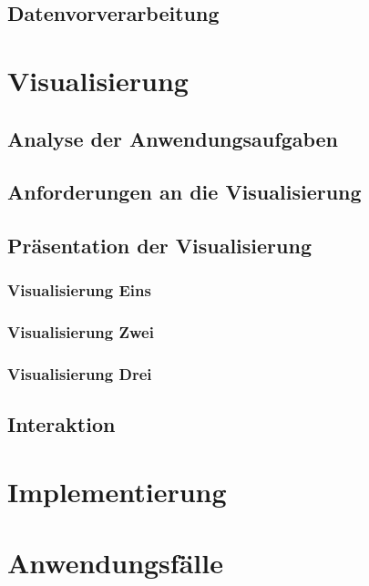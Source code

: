 \documentclass[paper=a4,12pt,titlepage,listof=totoc]{scrartcl}
\begin{document}
\subsection{Datenvorverarbeitung}
\newpage

\section{Visualisierung}

\subsection{Analyse der Anwendungsaufgaben}

\subsection{Anforderungen an die Visualisierung}

\subsection{Präsentation der Visualisierung}

\subsubsection{Visualisierung Eins}

\subsubsection{Visualisierung Zwei}

\subsubsection{Visualisierung Drei}


\subsection{Interaktion}
\newpage

\section{Implementierung}
\newpage

\section{Anwendungsfälle}
\end{document}
